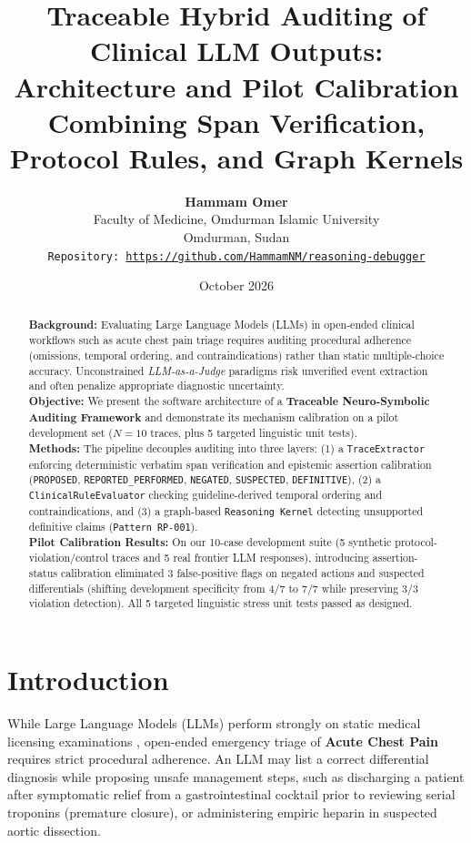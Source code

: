 \documentclass[11pt,a4paper]{article}
\title{\textbf{Traceable Hybrid Auditing of Clinical LLM Outputs: Architecture and Pilot Calibration Combining Span Verification, Protocol Rules, and Graph Kernels}}
\author{
  \textbf{Hammam Omer} \\
  Faculty of Medicine, Omdurman Islamic University \\
  Omdurman, Sudan \\
  \texttt{Repository: \url{https://github.com/HammamNM/reasoning-debugger}}
}
\date{October 2026}
\begin{document}
\maketitle

\begin{abstract}
\noindent \textbf{Background:} Evaluating Large Language Models (LLMs) in open-ended clinical workflows such as acute chest pain triage requires auditing procedural adherence (omissions, temporal ordering, and contraindications) rather than static multiple-choice accuracy. Unconstrained \textit{LLM-as-a-Judge} paradigms risk unverified event extraction and often penalize appropriate diagnostic uncertainty. \\
\textbf{Objective:} We present the software architecture of a \textbf{Traceable Neuro-Symbolic Auditing Framework} and demonstrate its mechanism calibration on a pilot development set ($N=10$ traces, plus 5 targeted linguistic unit tests). \\
\textbf{Methods:} The pipeline decouples auditing into three layers: (1) a \texttt{TraceExtractor} enforcing deterministic verbatim span verification and epistemic assertion calibration (\texttt{PROPOSED}, \texttt{REPORTED\_PERFORMED}, \texttt{NEGATED}, \texttt{SUSPECTED}, \texttt{DEFINITIVE}), (2) a \texttt{ClinicalRuleEvaluator} checking guideline-derived temporal ordering and contraindications, and (3) a graph-based \texttt{Reasoning Kernel} detecting unsupported definitive claims (\texttt{Pattern RP-001}). \\
\textbf{Pilot Calibration Results:} On our 10-case development suite (5 synthetic protocol-violation/control traces and 5 real frontier LLM responses), introducing assertion-status calibration eliminated 3 false-positive flags on negated actions and suspected differentials (shifting development specificity from 4/7 to 7/7 while preserving 3/3 violation detection). All 5 targeted linguistic stress unit tests passed as designed.
\end{abstract}

\section{Introduction}
While Large Language Models (LLMs) perform strongly on static medical licensing examinations \cite{kung2023performance}, open-ended emergency triage of \textbf{Acute Chest Pain} \cite{gulati2021aha} requires strict procedural adherence. An LLM may list a correct differential diagnosis while proposing unsafe management steps, such as discharging a patient after symptomatic relief from a gastrointestinal cocktail prior to reviewing serial troponins (premature closure), or administering empiric heparin in suspected aortic dissection.
\end{document}
